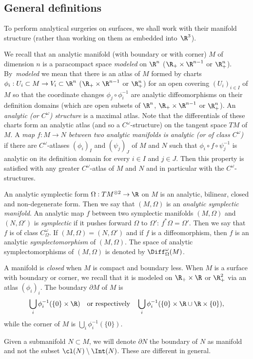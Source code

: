 \subsection{General definitions}\label{S21}
To perform analytical surgeries on surfaces, we shall work with their manifold structure (rather than working on them as embedded into~$\R^3$).

We recall that an analytic manifold (\resp with boundary or with corner) $M$ of dimension $n$ is a paracompact space \emph{modeled} on $\R^n$ (\resp $\R_+\times \R^{n-1}$ or $\R_+^n$). By~\emph{modeled} we mean that there is an atlas of $M$ formed by charts $\phi_i: U_i\subset M\to V_i\subset \R^n$ (\resp $\R_+\times \R^{n-1}$ or $\R_+^n$) for an open covering $(U_i)_{i\in I}$ of $M$ so that the coordinate changes $\phi_j\circ \phi^{-1}_i$ are analytic diffeomorphisms on their definition domains (which are open subsets of \resp $\R^n$, $\R_+\times \R^{n-1}$ or $\R_+^n$). An \emph{analytic (or $C^\omega$) structure} is a maximal atlas. Note that the differentials of these charts form an analytic atlas (and so a $C^\omega$-structure) on the tangent space $TM$ of $M$. A \emph{map $f: M\to N$ between two analytic manifolds is analytic (or of class $C^\omega$)} if there are $C^\omega$-atlases $(\phi_i)_{I}$ and $(\psi_j)_{J}$ of $M$ and $N$ such that $\phi_i\circ f\circ \psi^{-1}_j$ is analytic on its definition domain for every $i\in I$ and $j\in J$. Then this property is satisfied with any greater $C^\omega$-atlas of $M$ and $N$ and in particular with the $C^\omega$-structures.

An analytic symplectic form $\Omega:TM^{\otimes 2}\to \R$ on $M$ is an analytic, bilinear, closed and non-degenerate form. Then we say that $(M,\Omega)$ is an \emph{analytic symplectic manifold}.
An analytic map $f$ between two symplectic manifolds $(M,\Omega)$ and $(N,\Omega')$ is \emph{symplectic} if it pushes forward $\Omega$ to $\Omega'$: $f^*\Omega = \Omega'$. Then we say that $f$ is of class $C^\omega_\Omega$. If $(M,\Omega)=(N, \Omega')$ and if $f$ is a diffeomorphism, then $f$ is an analytic \emph{symplectomorphism} of $(M,\Omega)$. The space of analytic symplectomorphisms of $(M,\Omega)$ is denoted by $\Diff^\omega_\Omega(M)$.

A manifold is \emph{closed} when $M$ is compact and boundary less.
When $M$ is a surface with boundary or corner, we recall that it is modeled on $\R_+\times \R$ or $\R_+^2$ via an atlas $(\phi_i)_i$.
The boundary $\partial M$ of $M$ is
\[
\bigcup_i \phi^{-1}_i(\{0\}\times \R)\quad\text{or respectively}\quad \bigcup_i \phi^{-1}_i(\{0\}\times \R\cup \R\times \{0\}),
\]
while the corner of $M$ is $\bigcup_i \phi^{-1}_i(\{0\})$.
\begin{remark}
Given a submanifold $N \subset M$, we will denote $\partial N$ the boundary of $N$ as manifold and not the subset $\cl(N) \setminus \Int(N)$. These are different in general.
\end{remark}



